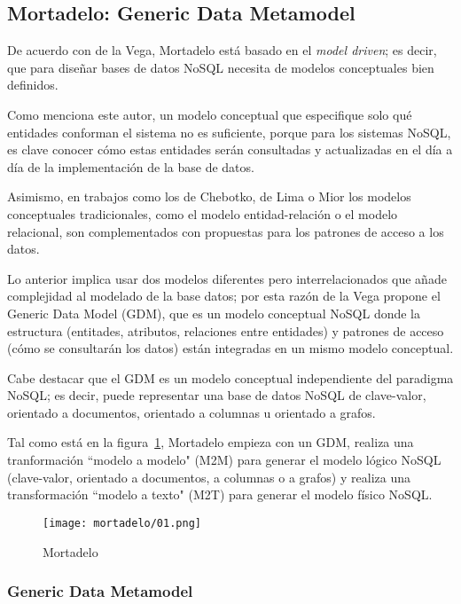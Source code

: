 \subsection{Mortadelo: Generic Data Metamodel}
De acuerdo con de la Vega\cite{de_la_vega_mortadelo_2020}, Mortadelo está basado en el \textit{model driven}; es decir, que para diseñar bases de datos NoSQL necesita de modelos conceptuales bien definidos.


Como menciona este autor, un modelo conceptual que especifique solo qué entidades conforman el sistema no es suficiente, porque para los sistemas NoSQL, es clave conocer cómo estas entidades serán consultadas y actualizadas en el día a día de la implementación de la base de datos.


Asimismo, en trabajos como los de Chebotko\cite{chebotko_big_2015}, de Lima\cite{de_lima_workload-driven_2015} o Mior\cite{mior_nose_2017-1} los modelos conceptuales tradicionales, como el modelo entidad-relación o el modelo relacional, son complementados con propuestas para los patrones de acceso a los datos.


Lo anterior implica usar dos modelos diferentes pero interrelacionados que añade complejidad al modelado de la base datos; por esta razón de la Vega propone el Generic Data Model (GDM), que es un modelo conceptual NoSQL donde la estructura (entitades, atributos, relaciones entre entidades) y patrones de acceso (cómo se consultarán los datos) están integradas en un mismo modelo conceptual.


Cabe destacar que el GDM es un modelo conceptual independiente del paradigma NoSQL; es decir, puede representar una base de datos NoSQL de clave-valor, orientado a documentos, orientado a columnas u orientado a grafos.


Tal como está en la figura~\ref{img:mortadelo-process}, Mortadelo empieza con un GDM, realiza una tranformación ``modelo a modelo" (M2M) para generar el modelo lógico NoSQL (clave-valor, orientado a documentos, a columnas o a grafos) y realiza una transformación ``modelo a texto" (M2T) para generar el modelo físico NoSQL.


\begin{figure}[h!t] 
    \centering
    \texttt{[image: mortadelo/01.png]}
    \caption{Mortadelo}
    \label{img:mortadelo-process}
\end{figure}

\subsubsection*{Generic Data Metamodel}


